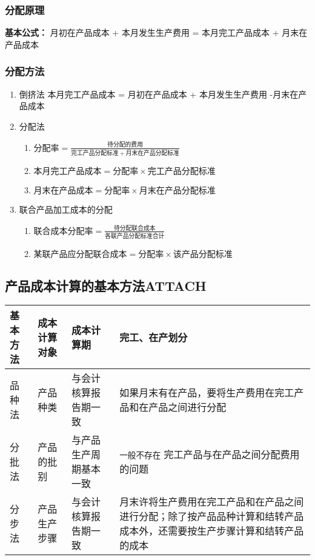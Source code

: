 \documentclass[11pt]{article}
\begin{document}
\subsubsection{分配原理}
\label{sec:orgb6a8e77}
\textbf{基本公式：} 月初在产品成本 + 本月发生生产费用 = 本月完工产品成本 + 月末在产品成本
\subsubsection{分配方法}
\label{sec:org8597584}
\begin{enumerate}
\item 倒挤法
\label{sec:orga943188}
本月完工产品成本 = 月初在产品成本 + 本月发生生产费用 -月末在产品成本
\item 分配法
\label{sec:org6ae7200}
\begin{enumerate}
\item \(分配率 = \frac{待分配的费用}{完工产品分配标准+月末在产品分配标准}\)
\item \(本月完工产品成本 = 分配率\times 完工产品分配标准\)
\item \(月末在产品成本 = 分配率 \times 月末在产品分配标准\)
\end{enumerate}
\item 联合产品加工成本的分配
\label{sec:org5d31a59}
\begin{enumerate}
\item \(联合成本分配率 = \frac{待分配联合成本}{各联产品分配标准合计}\)
\item \(某联产品应分配联合成本 = 分配率 \times 该产品分配标准\)
\end{enumerate}
\end{enumerate}
\subsection{产品成本计算的基本方法\hfill{}\textsc{ATTACH}}
\label{sec:orgd545008}
\begin{center}
\begin{tabular}{llll}
基本方法 & 成本计算对象 & 成本计算期 & 完工、在产划分\\
\hline
品种法 & 产品种类 & 与会计核算报告期一致 & 如果月末有在产品，要将生产费用在完工产品和在产品之间进行分配\\
分批法 & 产品的批别 & 与产品生产周期基本一致 & \texttt{一般不存在} 完工产品与在产品之间分配费用的问题\\
分步法 & 产品生产步骤 & 与会计核算报告期一致 & 月末许将生产费用在完工产品和在产品之间进行分配；除了按产品品种计算和结转产品成本外，还需要按生产步骤计算和结转产品的成本\\
\end{tabular}
\end{center}
\end{document}
